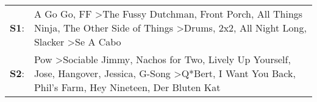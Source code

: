 \begin{supertabular}{p{0.03\textwidth}p{0.92\textwidth}}
 \textbf{S1}:  &                                                                A Go Go\textsuperscript{}, \enspace FF\textsuperscript{} \textgreater \enspace The Fussy Dutchman\textsuperscript{}, \enspace Front Porch\textsuperscript{}, \enspace All Things Ninja\textsuperscript{}, \enspace The Other Side of Things\textsuperscript{} \textgreater \enspace Drums\textsuperscript{}, \enspace 2x2\textsuperscript{}, \enspace All Night Long\textsuperscript{}, \enspace Slacker\textsuperscript{} \textgreater \enspace Se A Cabo\textsuperscript{}  \enspace  \\
 \textbf{S2}:  &  Pow\textsuperscript{} \textgreater \enspace Sociable Jimmy\textsuperscript{}, \enspace Nachos for Two\textsuperscript{}, \enspace Lively Up Yourself\textsuperscript{}, \enspace Jose\textsuperscript{}, \enspace Hangover\textsuperscript{}, \enspace Jessica\textsuperscript{}, \enspace G-Song\textsuperscript{} \textgreater \enspace Q*Bert\textsuperscript{}, \enspace I Want You Back\textsuperscript{}, \enspace Phil's Farm\textsuperscript{}, \enspace Hey Nineteen\textsuperscript{}, \enspace Der Bluten Kat\textsuperscript{}  \enspace  \\
\end{supertabular}
